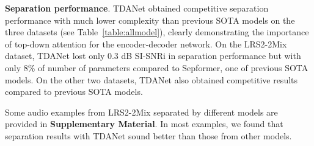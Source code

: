 \documentclass{article} \usepackage{iclr2023_conference,times}
\begin{document}
\textbf{Separation performance}. TDANet obtained competitive separation performance with much lower complexity than previous SOTA models on the three datasets (see Table~\ref{table:allmodel}), clearly demonstrating the importance of top-down attention for the encoder-decoder network. On the LRS2-2Mix dataset, TDANet lost only 0.3 dB SI-SNRi in separation performance but with only 8\% of number of parameters compared to Sepformer, one of previous SOTA models. On the other two datasets, TDANet also obtained competitive results compared to previous SOTA models.


Some audio examples from LRS2-2Mix separated by different models are provided in \textbf{Supplementary Material}. In most examples, we found that separation results with TDANet sound better than those from other models. 
\end{document}
